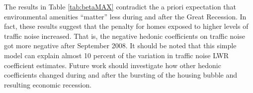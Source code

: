 \documentclass{article}\usepackage{graphicx, color}
\begin{document}
The results in Table \ref{tab:betaMAX} contradict the a priori expectation that environmental amenities ``matter'' less during and after the Great Recession. In fact, these results suggest that the penalty for homes exposed to higher levels of traffic noise increased. That is, the negative hedonic coefficients on traffic noise got more negative after September 2008. It should be noted that this simple model can explain almost 10 percent of the variation in traffic noise LWR coefficient estimates. Future work should investigate how other hedonic coefficients changed during and after the bursting of the housing bubble and resulting economic recession.

% 
% 
% 
% 
\end{document}
